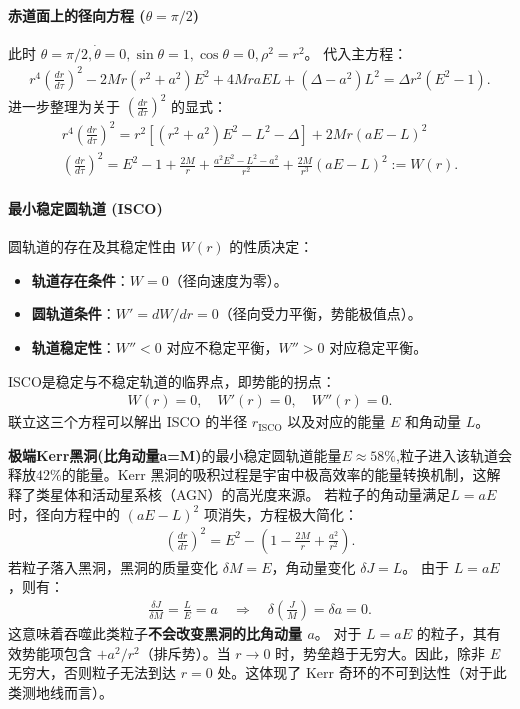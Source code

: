 \paragraph{赤道面上的径向方程 ($\theta = \pi/2$)}
此时 $\theta = \pi/2, \dot{\theta} = 0, \sin\theta = 1, \cos\theta = 0, \rho^2 = r^2$。
代入主方程：
\begin{align}
r^4 \left(\frac{dr}{d\tau}\right)^2 - 2Mr(r^2+a^2)E^2 + 4Mra EL + (\Delta - a^2)L^2 = \Delta r^2 (E^2 - 1).
\end{align}
进一步整理为关于 $\left(\frac{dr}{d\tau}\right)^2$ 的显式：
\begin{align}
r^4 \left(\frac{dr}{d\tau}\right)^2 = r^2 \left[ (r^2+a^2)E^2 - L^2 - \Delta \right] + 2Mr(aE - L)^2 \\
\left(\frac{dr}{d\tau}\right)^2 = E^2 - 1 + \frac{2M}{r} + \frac{a^2 E^2 - L^2 - a^2}{r^2} + \frac{2M}{r^3}(aE - L)^2 := W(r).
\end{align}

\paragraph{最小稳定圆轨道 (ISCO)}
圆轨道的存在及其稳定性由 $W(r)$ 的性质决定：
\begin{itemize}
    \item \textbf{轨道存在条件}：$W = 0$（径向速度为零）。
    \item \textbf{圆轨道条件}：$W' = dW/dr = 0$（径向受力平衡，势能极值点）。
    \item \textbf{轨道稳定性}：$W'' < 0$ 对应不稳定平衡，$W'' > 0$ 对应稳定平衡。
\end{itemize}

ISCO是稳定与不稳定轨道的临界点，即势能的拐点：
\begin{align}
W(r) = 0, \quad W'(r) = 0, \quad W''(r) = 0.
\end{align}
联立这三个方程可以解出 ISCO 的半径 $r_{\text{ISCO}}$ 以及对应的能量 $E$ 和角动量 $L$。

\textbf{极端Kerr黑洞(比角动量a=M)}的最小稳定圆轨道能量$E \approx 58\%$,粒子进入该轨道会释放$42\%$的能量。Kerr 黑洞的吸积过程是宇宙中极高效率的能量转换机制，这解释了类星体和活动星系核（AGN）的高光度来源。
若粒子的角动量满足\textbf{$L = aE$}时，径向方程中的 $(aE-L)^2$ 项消失，方程极大简化：
\begin{align}
\left(\frac{dr}{d\tau}\right)^2 = E^2 - \left( 1 - \frac{2M}{r} + \frac{a^2}{r^2} \right).
\end{align}
若粒子落入黑洞，黑洞的质量变化 $\delta M = E$，角动量变化 $\delta J = L$。
由于 $L = aE$，则有：
    \begin{align}
        \frac{\delta J}{\delta M} = \frac{L}{E} = a \quad \Rightarrow \quad \delta \left(\frac{J}{M}\right) = \delta a = 0.
    \end{align}
    这意味着吞噬此类粒子\textbf{不会改变黑洞的比角动量 $a$}。
    对于 $L=aE$ 的粒子，其有效势能项包含 $+a^2/r^2$（排斥势）。当 $r \to 0$ 时，势垒趋于无穷大。因此，除非 $E$ 无穷大，否则粒子无法到达 $r=0$ 处。这体现了 Kerr 奇环的不可到达性（对于此类测地线而言）。
